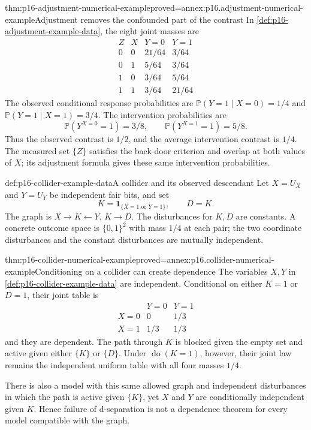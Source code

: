 \begin{hbtheorem}{thm:p16-adjustment-numerical-example}{proved=annex:p16.adjustment-numerical-example}{Adjustment removes the confounded part of the contrast}
In \cref{def:p16-adjustment-example-data}, the eight joint masses are
\[
\begin{array}{cc|cc}
 Z&X&Y=0&Y=1\\\hline
 0&0&21/64&3/64\\
 0&1&5/64&3/64\\
 1&0&3/64&5/64\\
 1&1&3/64&21/64
\end{array}
\]
The observed conditional response probabilities are
\(\mathbb P(Y=1\mid X=0)=1/4\) and
\(\mathbb P(Y=1\mid X=1)=3/4\). The intervention probabilities are
\[
 \mathbb P(Y^{X=0}=1)=3/8,\qquad
 \mathbb P(Y^{X=1}=1)=5/8.
\]
Thus the observed contrast is \(1/2\), and the average intervention
contrast is \(1/4\). The measured set \(\{Z\}\) satisfies the
back-door criterion and overlap at both values of \(X\); its
adjustment formula gives these same intervention probabilities.
\end{hbtheorem}

\begin{hbdefinition}{def:p16-collider-example-data}{A collider and its observed descendant}
Let \(X=U_X\) and \(Y=U_Y\) be independent fair bits, and set
\[
 K=\mathbf1_{\{X=1\text{ or }Y=1\}},\qquad D=K.
\]
The graph is \(X\to K\leftarrow Y\), \(K\to D\).
The disturbances for \(K,D\) are constants. A concrete outcome
space is \(\{0,1\}^2\) with mass \(1/4\) at each pair;
the two coordinate disturbances and the constant disturbances are
mutually independent.
\end{hbdefinition}

\begin{hbtheorem}{thm:p16-collider-numerical-example}{proved=annex:p16.collider-numerical-example}{Conditioning on a collider can create dependence}
The variables \(X,Y\) in \cref{def:p16-collider-example-data}
are independent. Conditional on either \(K=1\) or \(D=1\), their
joint table is
\[
\begin{array}{c|cc}
 &Y=0&Y=1\\\hline
 X=0&0&1/3\\
 X=1&1/3&1/3
\end{array}
\]
and they are dependent. The path through \(K\) is blocked given
the empty set and active given either \(\{K\}\) or \(\{D\}\).
Under \(\operatorname{do}(K=1)\), however, their joint law remains
the independent uniform table with all four masses \(1/4\).

There is also a model with this same allowed graph and independent
disturbances in which the path is active given \(\{K\}\), yet
\(X\) and \(Y\) are conditionally independent given \(K\).
Hence failure of d-separation is not a dependence theorem for every
model compatible with the graph.
\end{hbtheorem}

